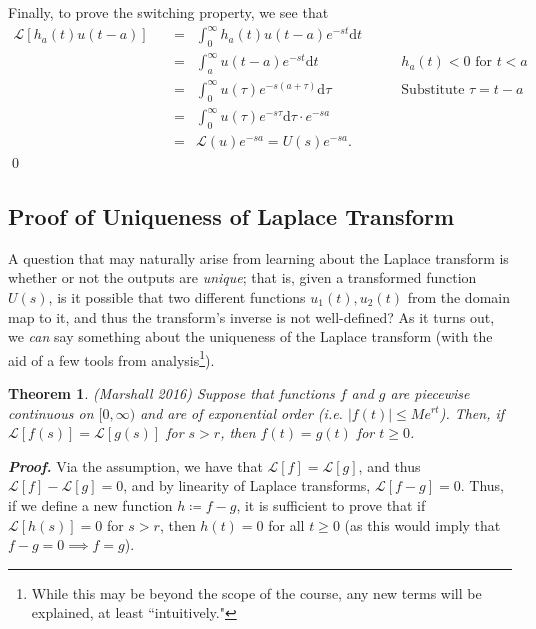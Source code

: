 \documentclass[12pt]{article}
\theoremstyle{plain}
\newtheorem{theorem}{Theorem}[section]
\theoremstyle{definition}
\begin{document}
Finally, to prove the switching property, we see that
\begin{align*}
    \mathcal{L}[h_a(t)u(t-a)] \quad & = & \int_{0}^{\infty} h_a(t)u(t-a)e^{-st}\mathrm{d}t & \\
    & = & \int_{a}^{\infty}u(t-a)e^{-st}\mathrm{d}t & \qquad \text{$h_a(t)<0$ for $t<a$} \\
    & = & \int_{0}^{\infty}u(\tau)e^{-s(a+\tau)} \mathrm{d}\tau & \qquad \text{Substitute $\tau=t-a$} \\
    & = & \int_{0}^{\infty}u(\tau)e^{-s\tau}\mathrm{d}\tau \cdot e^{-sa} \\
    & = & \mathcal{L}(u) e^{-sa} = U(s)e^{-sa}.
\end{align*}
\qed

\subsection{Proof of Uniqueness of Laplace Transform}
A question that may naturally arise from learning about the Laplace transform is whether or not the outputs are \emph{unique}; that is, given a transformed function $U(s)$, is it possible that two different functions $u_1(t), u_2(t)$ from the domain map to it, and thus the transform's inverse is not well-defined? As it turns out, we \emph{can} say something about the uniqueness of the Laplace transform (with the aid of a few tools from analysis\footnote{While this may be beyond the scope of the course, any new terms will be explained, at least ``intuitively."}).
\begin{theorem}
    (Marshall 2016) Suppose that functions $f$ and $g$ are piecewise continuous on $[0, \infty)$ and are of exponential order (i.e. $|f(t)|\leq Me^{rt}$). Then, if $\mathcal{L}[f(s)]=\mathcal{L}[g(s)]$ for $s>r$, then $f(t)=g(t)$ for $t\geq 0$.
\end{theorem}
\emph{\textbf{Proof.}} Via the assumption, we have that $\mathcal{L}[f]=\mathcal{L}[g]$, and thus $\mathcal{L}[f]-\mathcal{L}[g]=0$, and by linearity of Laplace transforms, $\mathcal{L}[f-g]=0$. Thus, if we define a new function $h\coloneq f-g$, it is sufficient to prove that if $\mathcal{L}[h(s)]=0$ for $s>r$, then $h(t)=0$ for all $t\geq 0$ (as this would imply that $f-g=0\implies f=g$).
\end{document}
